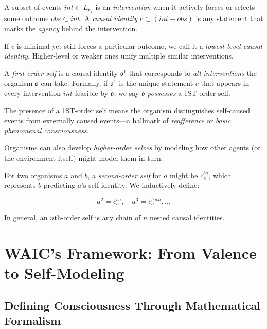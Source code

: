 \documentclass[12pt]{article}
\begin{document}
\begin{definition}
A subset of events $int \subset L_{\mathfrak{v}_\mathfrak{o}}$ is an \textit{intervention} when it actively forces or selects some outcome $obs \subset int$. A \textit{causal identity} $c \subset (int - obs)$ is any statement that marks the \textit{agency} behind the intervention. 

If $c$ is minimal yet still forces a particular outcome, we call it a \textit{lowest-level causal identity}. Higher-level or weaker ones unify multiple similar interventions.
\end{definition}

\begin{definition}
A \textit{first-order self} is a causal identity $\mathfrak{o}^1$ that corresponds to \textit{all interventions} the organism $\mathfrak{o}$ can take. Formally, if $\mathfrak{o}^1$ is the unique statement $c$ that appears in every intervention $int$ feasible by $\mathfrak{o}$, we say $\mathfrak{o}$ \textit{possesses} a 1ST-order self.
\end{definition}

The presence of a 1ST-order self means the organism distinguishes self-caused events from externally caused events---a hallmark of \textit{reafference} or \textit{basic phenomenal consciousness}.

Organisms can also develop \textit{higher-order selves} by modeling how other agents (or the environment itself) might model them in turn:

\begin{definition}
For two organisms $a$ and $b$, a \textit{second-order self} for $a$ might be $c_a^{ba}$, which represents $b$ predicting $a$'s self-identity. We inductively define:

\[
   a^2 = c_a^{ba},\quad 
   a^3 = c_a^{baba},\dots
\]

In general, an $n$th-order self is any chain of $n$ nested causal identities.
\end{definition}

\section{WAIC's Framework: From Valence to Self-Modeling}

\subsection{Defining Consciousness Through Mathematical Formalism}
\end{document}
